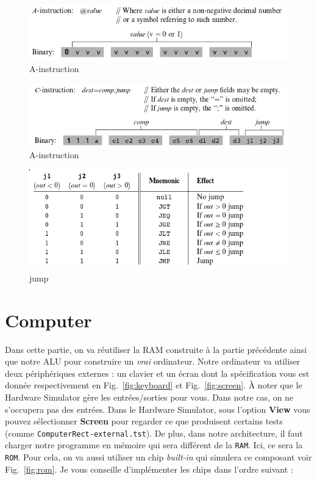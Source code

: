 \documentclass[11pt]{article}
\begin{document}
\begin{figure}
  \centering
  \includegraphics[scale=0.5]{pictures/instructionA.png}
  \caption{A-instruction}
  \label{fig:A}
\end{figure}

\begin{figure}
  \centering
  \includegraphics[scale=0.5]{pictures/instructionC.png}
  \caption{A-instruction}
  \label{fig:C}
\end{figure}

\begin{figure}
  \centering
  \includegraphics[scale=0.5]{pictures/jump.png}
  \caption{jump}
  \label{fig:jump}
\end{figure}

\section{Computer}
\label{sec:computer}

Dans cette partie, on va réutiliser la RAM construite à la partie précédente ainsi que notre ALU pour construire un \textit{vrai} ordinateur. Notre ordinateur va utiliser deux périphériques externes : un clavier et un écran dont la spécification vous est donnée respectivement en Fig.~\ref{fig:keyboard} et Fig.~\ref{fig:screen}. À noter que le Hardware Simulator gère les entrées/sorties pour vous. Dans notre cas, on ne s'occupera pas des entrées. Dans le Hardware Simulator, sous l'option \textbf{View} vous pouvez sélectionner \textbf{Screen} pour regarder ce que produisent certains tests (comme \texttt{ComputerRect-external.tst}). De plus, dans notre architecture, il faut charger notre programme en mémoire qui sera différent de la \texttt{RAM}. Ici, ce sera la \texttt{ROM}. Pour cela, on va aussi utiliser un chip \textit{built-in} qui simulera ce composant voir Fig.~\ref{fig:rom}. Je vous conseille d'implémenter les chips dans l'ordre suivant :
\end{document}
